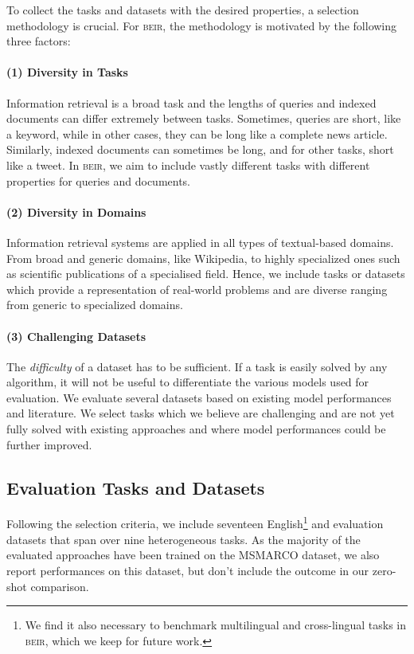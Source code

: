 \documentclass[11pt]{article}
\newcommand{\custo}[1]{\textsc{\normalsize #1}}
\newcommand{\beir}{\custo{beir}\xspace}
\begin{document}
To collect the tasks and datasets with the desired properties, a selection methodology is crucial. For \beir, the methodology is motivated by the following three factors:

\paragraph{(1) Diversity in Tasks} Information retrieval is a broad task and the lengths of queries and indexed documents can differ extremely between tasks. Sometimes, queries are short, like a keyword, while in other cases, they can be long like a complete news article. Similarly, indexed documents can sometimes be long, and for other tasks, short like a tweet. In \beir, we aim to include vastly different tasks with different properties for queries and documents. 

\paragraph{(2) Diversity in Domains} Information retrieval systems are applied in all types of textual-based domains. From broad and generic domains, like Wikipedia, to highly specialized ones such as scientific publications of a specialised field. Hence, we include tasks or datasets which provide a representation of real-world problems and are diverse ranging from generic to specialized domains.

\paragraph{(3) Challenging Datasets} 
The \textit{difficulty} of a dataset has to be sufficient. If a task is easily solved by any algorithm, it will not be useful to differentiate the various models used for evaluation. We evaluate several datasets based on existing model performances and literature. We select tasks which we believe are challenging and are not yet fully solved with existing approaches and where model performances could be further improved. 

\subsection{Evaluation Tasks and Datasets} 

Following the selection criteria, we include seventeen English\footnote{We find it also necessary to benchmark multilingual and cross-lingual tasks in \beir, which we keep for future work.} and evaluation datasets that span over nine heterogeneous tasks. As the majority of the evaluated approaches have been trained on the MSMARCO dataset, we also report performances on this dataset, but don't include the outcome in our zero-shot comparison. 
\end{document}
